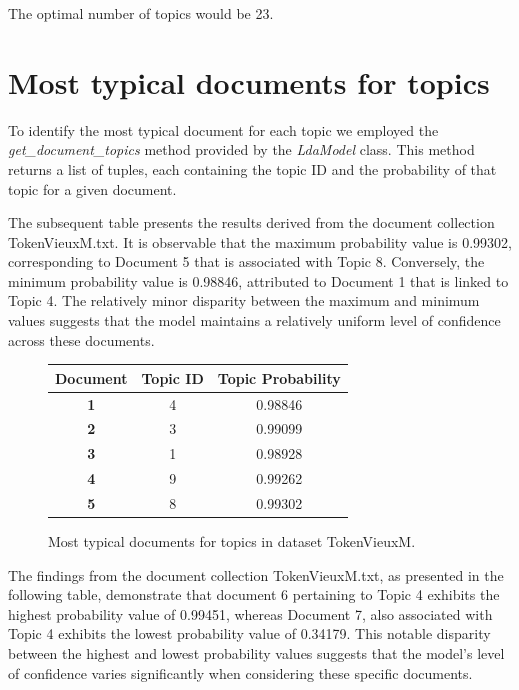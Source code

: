 \documentclass[10pt]{article} %
\begin{document}
	The optimal number of topics would be 23.
	
\section{Most typical documents for topics}
To identify the most typical document for each topic we employed the \textit{get\_document\_topics} method provided by the \textit{LdaModel} class. This method returns a list of tuples, each containing the topic ID and the probability of that topic for a given document. 

The subsequent table presents the results derived from the document collection TokenVieuxM.txt. It is observable that the maximum probability value is 0.99302, corresponding to Document 5 that is associated with Topic 8. Conversely, the minimum probability value is 0.98846, attributed to Document 1 that is linked to Topic 4. The relatively minor disparity between the maximum and minimum values suggests that the model maintains a relatively uniform level of confidence across these documents.

\begin{figure}[H]
	\centering
	\begin{tabular}{|c|c|c|}
		\hline \textbf{Document} & \textbf{Topic ID} & \textbf{Topic Probability}  \\  
		\hline \textbf{1} & 4 & 0.98846 \\
		\hline \textbf{2} & 3 & 0.99099 \\
		\hline \textbf{3} & 1 & 0.98928 \\
		\hline \textbf{4} & 9 & 0.99262 \\
		\hline \textbf{5} & 8 & 0.99302 \\
		\hline
	\end{tabular}
	\caption{Most typical documents for topics in dataset TokenVieuxM.}
\end{figure}

The findings from the document collection TokenVieuxM.txt, as presented in the following table, demonstrate that document 6 pertaining to Topic 4 exhibits the highest probability value of 0.99451, whereas Document 7, also associated with Topic 4 exhibits the lowest probability value of 0.34179. This notable disparity between the highest and lowest probability values suggests that the model's level of confidence varies significantly when considering these specific documents.
\end{document}
